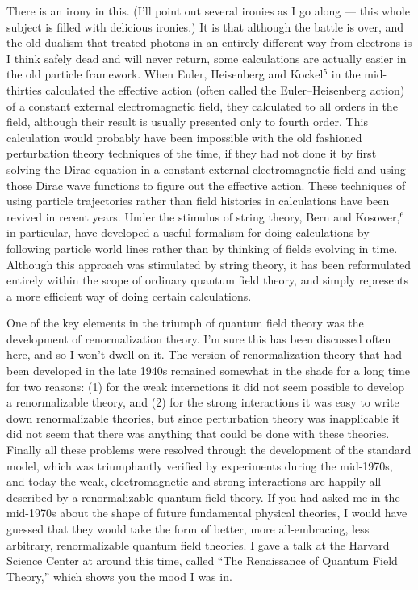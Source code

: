 \documentclass[12pt]{article}
\begin{document}
There is an irony in this.  (I'll point out several ironies
as I go along --- this whole subject is filled with
delicious ironies.)  It is that although the battle is over,
and the old dualism that treated photons in an entirely
different way from electrons is I think safely dead and will
never return, some calculations are actually easier in the
old particle framework.  When Euler, Heisenberg and
Kockel$^5$
in the mid-thirties calculated the effective action (often
called the Euler--Heisenberg action) of a constant external
electromagnetic field, they calculated to all orders in the
field, although their result is usually  presented only to
fourth order.  This calculation would probably have been
impossible with the old fashioned perturbation theory
techniques of the time, if they had not done it by first
solving the Dirac equation in a constant external
electromagnetic field and using those Dirac wave functions
to figure out the effective action.  These techniques of
using particle trajectories  rather than field histories in
calculations have been revived in recent years. Under the
stimulus of string theory, Bern and Kosower,$^6$ in
particular,
have developed a useful formalism for doing calculations by
following particle world lines rather than by thinking of
fields evolving in time.  Although this approach was
stimulated by string theory, it has been reformulated
entirely within the scope of ordinary quantum field theory,
and simply represents a more efficient way of doing certain
calculations.

One of the key elements in the triumph of quantum field
theory was the development of renormalization theory.  I'm
sure this has been discussed often here, and so I won't
dwell on it.  The version of renormalization theory that had
been developed in the late 1940s remained somewhat in the
shade for a long time for two reasons:  (1) for the weak
interactions it did not seem possible to develop a
renormalizable theory, and (2) for the strong interactions
it was easy to write down renormalizable theories, but since
perturbation theory was inapplicable it did not seem that
there was anything that could be done with these theories.
Finally all these problems were resolved through the
development of the standard model, which was triumphantly
verified by experiments during the mid-1970s, and today the
weak, electromagnetic and strong interactions are happily
all described by a renormalizable quantum field theory.  If
you had asked me in the mid-1970s about the shape of future
fundamental physical theories, I would have guessed that
they would take the form of better, more all-embracing, less
arbitrary, renormalizable quantum field theories.  I gave a
talk at the Harvard Science Center at around this time,
called ``The Renaissance of Quantum Field Theory,'' which
shows you the mood I was in.
\end{document}
